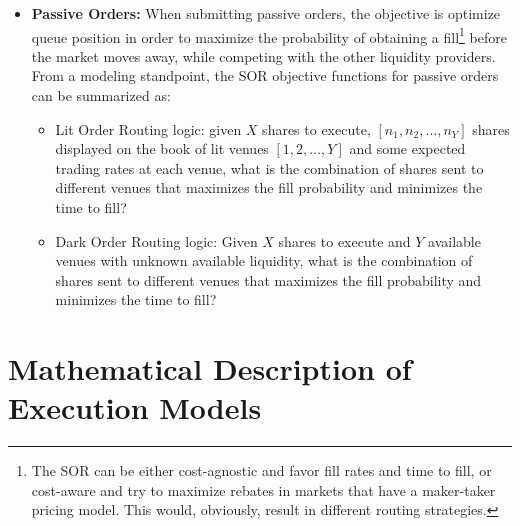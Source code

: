 \begin{itemize}
\item \textbf{Passive Orders:} When submitting passive orders, the objective is optimize queue position in order to maximize the probability of obtaining a fill\footnote{The SOR can be either cost-agnostic and favor fill rates and time to fill, or cost-aware and try to maximize rebates in markets that have a maker-taker pricing model. This would, obviously, result in different routing strategies.} before the market moves away, while competing with the other liquidity providers. From a modeling standpoint, the SOR objective functions for passive orders can be summarized as:
    \begin{itemize}
        \item Lit Order Routing logic: given $X$ shares to execute, $[n_1, n_2, \ldots, n_Y]$ shares displayed on the book of lit venues $[1, 2, \ldots, Y]$ and some expected trading rates at each venue, what is the combination of shares sent to different venues that maximizes the fill probability and minimizes the time to fill?
        \item Dark Order Routing logic: Given $X$ shares to execute and $Y$ available venues with unknown available liquidity, what is the combination of shares sent to different venues that maximizes the fill probability and minimizes the time to fill?
    \end{itemize}
\end{itemize}



\section{Mathematical Description of Execution Models}


